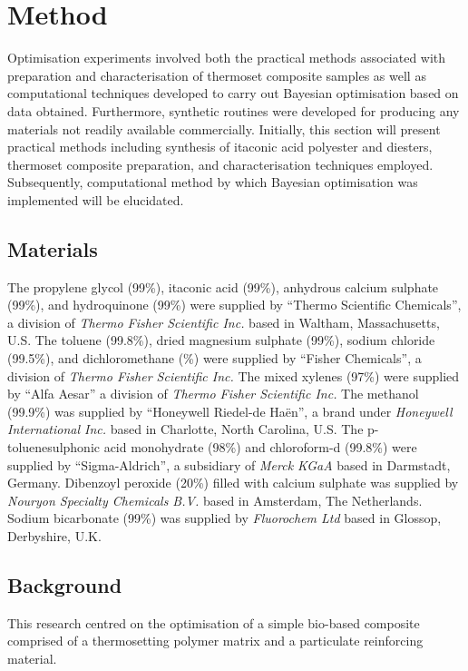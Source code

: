 \section{Method}
Optimisation experiments involved both the practical methods associated with
 preparation and characterisation of thermoset composite samples as well as
 computational techniques developed to carry out Bayesian optimisation based
 on data obtained.
Furthermore, synthetic routines were developed for producing any materials
 not readily available commercially.
Initially, this section will present practical methods including
 synthesis of itaconic acid polyester and diesters, thermoset composite
 preparation, and characterisation techniques employed.
Subsequently, computational method by which Bayesian optimisation was
 implemented will be elucidated.

\subsection{Materials}
The propylene glycol (99\%), itaconic acid (99\%), anhydrous calcium
 sulphate (99\%), and hydroquinone (99\%) were supplied by
 ``Thermo Scientific Chemicals'', a division of \textit{Thermo Fisher
 Scientific Inc.} based in Waltham, Massachusetts, U.S.
The toluene (99.8\%), dried magnesium sulphate (99\%), sodium chloride
 (99.5\%), and dichloromethane (\%) were supplied by ``Fisher Chemicals'',
  a division of \textit{Thermo Fisher Scientific Inc.}
The mixed xylenes (97\%) were supplied by ``Alfa Aesar'' a division of
 \textit{Thermo Fisher Scientific Inc.}
The methanol (99.9\%) was supplied by ``Honeywell Riedel-de Ha\"{e}n'',
 a brand under \textit{Honeywell International Inc.} based in Charlotte,
 North Carolina, U.S.
The p-toluenesulphonic acid monohydrate (98\%) and chloroform-d (99.8\%)
 were supplied by ``Sigma-Aldrich'', a subsidiary of \textit{Merck KGaA}
 based in Darmstadt, Germany.
Dibenzoyl peroxide (20\%) filled with calcium sulphate was supplied by
 \textit{Nouryon Specialty Chemicals B.V.} based in Amsterdam,
 The Netherlands.
Sodium bicarbonate (99\%) was supplied by \textit{Fluorochem Ltd} based in
 Glossop, Derbyshire, U.K.

\subsection{Background}
This research centred on the optimisation of a simple bio-based composite
 comprised of a thermosetting polymer matrix and a particulate reinforcing
 material.

